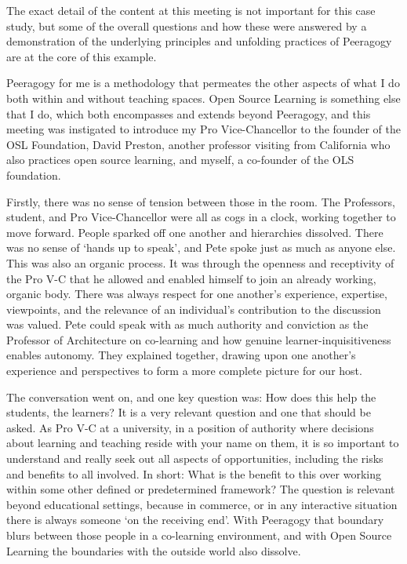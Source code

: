 The exact detail of the content at this meeting is not important for
this case study, but some of the overall questions and how these were
answered by a demonstration of the underlying principles and unfolding
practices of Peeragogy are at the core of this example.

Peeragogy for me is a methodology that permeates the other aspects of
what I do both within and without teaching spaces. Open Source Learning
is something else that I do, which both encompasses and extends beyond
Peeragogy, and this meeting was instigated to introduce my Pro
Vice-Chancellor to the founder of the OSL Foundation, David Preston,
another professor visiting from California who also practices open
source learning, and myself, a co-founder of the OLS foundation.

Firstly, there was no sense of tension between those in the room. The
Professors, student, and Pro Vice-Chancellor were all as cogs in a
clock, working together to move forward. People sparked off one another
and hierarchies dissolved. There was no sense of `hands up to speak',
and Pete spoke just as much as anyone else. This was also an organic
process. It was through the openness and receptivity of the Pro V-C that
he allowed and enabled himself to join an already working, organic body.
There was always respect for one another's experience, expertise,
viewpoints, and the relevance of an individual's contribution to the
discussion was valued. Pete could speak with as much authority and
conviction as the Professor of Architecture on co-learning and how
genuine learner-inquisitiveness enables autonomy. They explained
together, drawing upon one another's experience and perspectives to form
a more complete picture for our host.

The conversation went on, and one key question was: How does this help
the students, the learners? It is a very relevant question and one that
should be asked. As Pro V-C at a university, in a position of authority
where decisions about learning and teaching reside with your name on
them, it is so important to understand and really seek out all aspects
of opportunities, including the risks and benefits to all involved. In
short: What is the benefit to this over working within some other
defined or predetermined framework? The question is relevant beyond
educational settings, because in commerce, or in any interactive
situation there is always someone `on the receiving end'. With Peeragogy
that boundary blurs between those people in a co-learning environment,
and with Open Source Learning the boundaries with the outside world also
dissolve.

